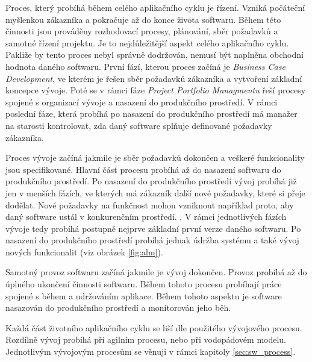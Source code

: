 \documentclass[czech,master,public,dept460,male,cpdeclaration,oneside]{diploma}
\begin{document}
Proces, který probíhá během celého aplikačního cyklu je řízení. Vzniká počáteční myšlenkou zákazníka a pokračuje až do konce života softwaru. Během této činnosti jsou prováděny rozhodovací procesy, plánování, sběr požadavků a samotné řízení projektu. Je to nejdůležitější aspekt celého aplikačního cyklu. Pakliže by tento proces nebyl správně dodržován, nemusí být naplněna obchodní hodnota daného softwaru. \cite{alm_chappell} První fází, kterou proces začíná je \textit{Business Case Development}, ve kterém je řešen sběr požadavků zákazníka a vytvoření základní koncepce vývoje. Poté se v rámci fáze \textit{Project Portfolio Managmentu} řeší procesy spojené s organizací vývoje a nasazení do produkčního prostředí. V rámci poslední fáze, která probíhá po nasazení do produkčního prostředí má manažer na starosti kontrolovat, zda daný software splňuje definované požadavky zákazníka.

Proces vývoje začíná jakmile je sběr požadavků dokončen a veškeré funkcionality jsou specifikované. Hlavní část procesu probíhá až do nasazení softwaru do produkčního prostředí. Po nasazení do produkčního prostředí vývoj probíhá již jen v menších fázích, ve kterých má zákazník další nové požadavky, které si přeje dodělat. Nové požadavky na funkčnost mohou vzniknout například proto, aby daný software ustál v konkurenčním prostředí. \cite{alm_chappell}. V rámci jednotlivých fázích vývoje tedy probíhá postupně nejprve základní první verze daného softwaru. Po nasazení do produkčního prostředí probíhá jednak údržba systému a také vývoj nových funkcionalit (viz obrázek \ref{fig:alm}).

Samotný provoz softwaru začíná jakmile je vývoj dokončen. Provoz probíhá až do úplného ukončení činnosti softwaru. Během tohoto procesu probíhají práce spojené s během a udržováním aplikace. Během tohoto aspektu je software nasazován do produkčního prostředí a monitorován jeho běh.  \cite{alm_chappell} 

Každá část životního aplikačního cyklu se liší dle použitého vývojového procesu. Rozdílně vývoj probíhá při agilním procesu, nebo při vodopádovém modelu. Jednotlivým vývojovým procesům se věnuji v rámci kapitoly \ref{sec:sw_process}.


\end{document}
